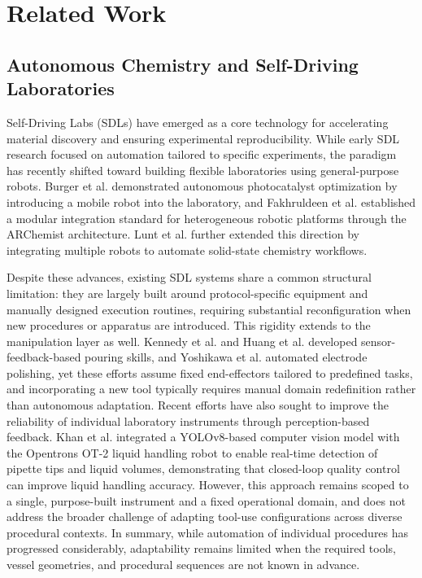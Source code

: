 \documentclass{ieeeaccess}
\begin{document}
\section{Related Work}\label{sec:2}
\subsection{Autonomous Chemistry and Self-Driving Laboratories}\label{sec:2.1}
Self-Driving Labs (SDLs) have emerged as a core technology for accelerating material discovery and ensuring experimental reproducibility. While early SDL research focused on automation tailored to specific experiments, the paradigm has recently shifted toward building flexible laboratories using general-purpose robots. Burger et al. \cite{ref3} demonstrated autonomous photocatalyst optimization by introducing a mobile robot into the laboratory, and Fakhruldeen et al. \cite{ref4} established a modular integration standard for heterogeneous robotic platforms through the ARChemist architecture. Lunt et al. \cite{ref7} further extended this direction by integrating multiple robots to automate solid-state chemistry workflows.

Despite these advances, existing SDL systems share a common structural limitation: they are largely built around protocol-specific equipment and manually designed execution routines, requiring substantial reconfiguration when new procedures or apparatus are introduced. This rigidity extends to the manipulation layer as well. Kennedy et al. \cite{ref21} and Huang et al. \cite{ref22} developed sensor-feedback-based pouring skills, and Yoshikawa et al. \cite{ref23} automated electrode polishing, yet these efforts assume fixed end-effectors tailored to predefined tasks, and incorporating a new tool typically requires manual domain redefinition rather than autonomous adaptation. Recent efforts have also sought to improve the reliability of individual laboratory instruments through perception-based feedback. Khan et al. \cite{khan2025real} integrated a YOLOv8-based computer vision model with the Opentrons OT-2 liquid handling robot to enable real-time detection of pipette tips and liquid volumes, demonstrating that closed-loop quality control can improve liquid handling accuracy. However, this approach remains scoped to a single, purpose-built instrument and a fixed operational domain, and does not address the broader challenge of adapting tool-use configurations across diverse procedural contexts. In summary, while automation of individual procedures has progressed considerably, adaptability remains limited when the required tools, vessel geometries, and procedural sequences are not known in advance.
\end{document}
